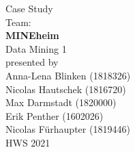 \begin{titlepage}
	\vspace*{2cm}
  \begin{center}
   {\Large Case Study\\}
   \vspace{2cm} 
   {Team:\\}
   {\Large \textbf{MINEheim}\\}
   \vspace{1cm}
   {Data Mining 1\\}
   \vspace{2cm}
   {presented by\\
    Anna-Lena Blinken (1818326)\\
	Nicolas Hautschek (1816720)\\
	Max Darmstadt (1820000)\\
	Erik Penther (1602026)\\
	Nicolas Fürhaupter (1819446)\\
   }
   \vspace{1cm} 
   {HWS 2021}
  \end{center}
\end{titlepage} 